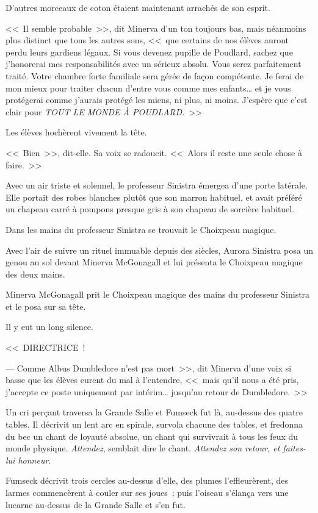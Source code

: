D'autres morceaux de coton étaient maintenant arrachés de son esprit.

<<~Il semble probable~>>, dit Minerva d'un ton toujours bas, mais néanmoins plus distinct que tous les autres sons, <<~que certains de nos élèves auront perdu leurs gardiens légaux. Si vous devenez pupille de Poudlard, sachez que j'honorerai mes responsabilités avec un sérieux absolu. Vous serez parfaitement traité. Votre chambre forte familiale sera gérée de façon compétente. Je ferai de mon mieux pour traiter chacun d'entre vous comme mes enfants… et je vous protégerai comme j'aurais protégé les miens, ni plus, ni moins. J'espère que c'est clair pour \emph{TOUT LE MONDE À POUDLARD.}~>>

Les élèves hochèrent vivement la tête.

<<~Bien~>>, dit-elle. Sa voix se radoucit. <<~Alors il reste une seule chose à faire.~>>

Avec un air triste et solennel, le professeur Sinistra émergea d'une porte latérale. Elle portait des robes blanches plutôt que son marron habituel, et avait préféré un chapeau carré à pompons presque gris à son chapeau de sorcière habituel.

Dans les mains du professeur Sinistra se trouvait le Choixpeau magique.

Avec l'air de suivre un rituel immuable depuis des siècles, Aurora Sinistra posa un genou au sol devant Minerva McGonagall et lui présenta le Choixpeau magique des deux mains.

Minerva McGonagall prit le Choixpeau magique des mains du professeur Sinistra et le posa sur sa tête.

Il y eut un long silence.

<<~DIRECTRICE~!

--- Comme Albus Dumbledore n'est pas mort~>>, dit Minerva d'une voix si basse que les élèves eurent du mal à l'entendre, <<~mais qu'il nous a été pris, j'accepte ce poste uniquement par intérim… jusqu'au retour de Dumbledore.~>>

Un cri perçant traversa la Grande Salle et Fumseck fut là, au-dessus des quatre tables. Il décrivit un lent arc en spirale, survola chacune des tables, et fredonna du bec un chant de loyauté absolue, un chant qui survivrait à tous les feux du monde physique. \emph{Attendez}, semblait dire le chant. \emph{Attendez son retour, et faites-lui honneur.}

Fumseck décrivit trois cercles au-dessus d'elle, des plumes l'effleurèrent, des larmes commencèrent à couler sur ses joues~; puis l'oiseau s'élança vers une lucarne au-dessus de la Grande Salle et s'en fut.
